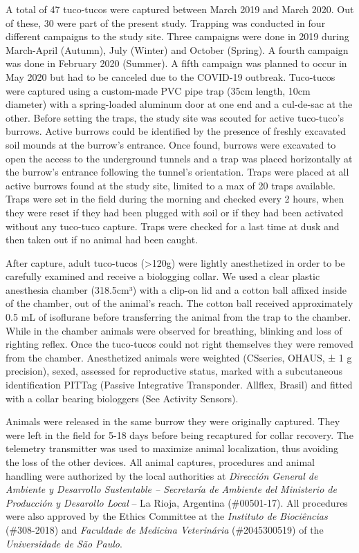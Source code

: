 \documentclass[english,msc,numbers,hidelinks]{coppe}
\begin{document}
  A total of 47 tuco-tucos were captured between March 2019 and March 2020. Out of these, 30 were part of the present study. Trapping was conducted in four different campaigns to the study site. Three campaigns were done in 2019 during March-April (Autumn), July (Winter) and October (Spring). A fourth campaign was done in February 2020 (Summer). A fifth campaign was planned to occur in May 2020 but had to be canceled due to the COVID-19 outbreak. Tuco-tucos were captured using a custom-made PVC pipe trap (35cm length, 10cm diameter) with a spring-loaded aluminum door at one end and a cul-de-sac at the other. Before setting the traps, the study site was scouted for active tuco-tuco's burrows. Active burrows could be identified by the presence of freshly excavated soil mounds at the burrow's entrance. Once found, burrows were excavated to open the access to the underground tunnels and a trap was placed horizontally at the burrow's entrance following the tunnel's orientation. Traps were placed at all active burrows found at the study site, limited to a max of 20 traps available. Traps were set in the field during the morning and checked every 2 hours, when they were reset if they had been plugged with soil or if they had been activated without any tuco-tuco capture. Traps were checked for a last time at dusk and then taken out if no animal had been caught.

  After capture, adult tuco-tucos (\textgreater120g) were lightly anesthetized in order to be carefully examined and receive a biologging collar. We used a clear plastic anesthesia chamber (318.5cm³) with a clip-on lid and a cotton ball affixed inside of the chamber, out of the animal's reach. The cotton ball received approximately 0.5 mL of isoflurane before transferring the animal from the trap to the chamber. While in the chamber animals were observed for breathing, blinking and loss of righting reflex. Once the tuco-tucos could not right themselves they were removed from the chamber. Anesthetized animals were weighted (CSseries, OHAUS, ± 1 g precision), sexed, assessed for reproductive status, marked with a subcutaneous identification PITTag (Passive Integrative Transponder. Allflex, Brasil) and fitted with a collar bearing biologgers (See Activity Sensors).

  Animals were released in the same burrow they were originally captured. They were left in the field for 5-18 days before being recaptured for collar recovery. The telemetry transmitter was used to maximize animal localization, thus avoiding the loss of the other devices. All animal captures, procedures and animal handling were authorized by the local authorities at \emph{Dirección General de Ambiente y Desarrollo Sustentable -- Secretaría de Ambiente del Ministerio de Producción y Desarollo Local} -- La Rioja, Argentina (\#00501-17). All procedures were also approved by the Ethics Committee at the \emph{Instituto de Biociências} (\#308-2018) and \emph{Faculdade de Medicina Veterinária} (\#2045300519) of the \emph{Universidade de São Paulo}.
\end{document}
